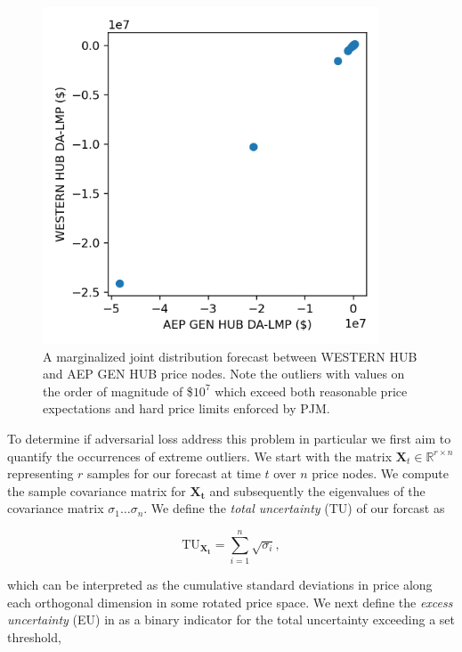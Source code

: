 \begin{figure}[htbp]
    \caption[Forecast joint distribution with extreme outliers]{
        A marginalized joint distribution forecast between WESTERN HUB and AEP GEN HUB price nodes.
        Note the outliers with values on the order of magnitude of \$$10^7$ which exceed both
        reasonable price expectations and hard price limits enforced by PJM.
    }
    \begin{center}
        \setlength{\fboxsep}{0pt}%
        \setlength{\fboxrule}{1pt}%
        \includegraphics[width=100mm]{figs/bad_samples}
    \end{center}
    \label{fig:badsamples}
\end{figure}

To determine if adversarial loss address this problem in particular we first aim to quantify the occurrences of extreme
outliers.
We start with the matrix $\mathbf{X}_t \in \mathbb{R}^{r \times n}$ representing $r$ samples for our forecast at time
$t$ over $n$ price nodes.
We compute the sample covariance matrix for $\mathbf{X_t}$ and subsequently the eigenvalues of the covariance matrix
${\sigma_1 \dots \sigma_n}$.
We define the \textit{total uncertainty} (TU) of our forcast as

\begin{equation*}
    \text{TU}_\mathbf{X_t} = \sum_{i=1}^{n} \sqrt{\sigma_i},
    \label{eq:total_uncertainty}
\end{equation*}

which can be interpreted as the cumulative standard deviations in price along each orthogonal dimension in some rotated
price space.
We next define the \textit{excess uncertainty} (EU) in as a binary indicator for the total uncertainty exceeding a set
threshold,

